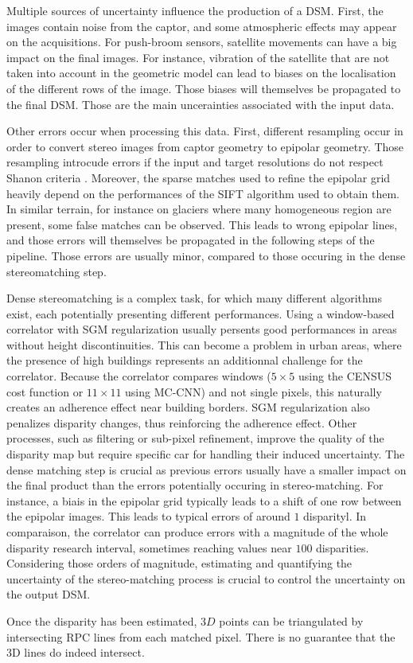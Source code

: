 Multiple sources of uncertainty influence the production of a DSM. First, the images contain noise from the captor, and some atmospheric effects may appear on the acquisitions. For push-broom sensors, satellite movements can have a big impact on the final images. For instance, vibration of the satellite that are not taken into account in the geometric model can lead to biases on the localisation of the different rows of the image. Those biases will themselves be propagated to the final DSM. Those are the main uncerainties associated with the input data.

Other errors occur when processing this data. First, different resampling occur in order to convert stereo images from captor geometry to epipolar geometry. Those resampling introcude errors if the input and target resolutions do not respect Shanon criteria \cite{delon_small_2007} . Moreover, the sparse matches used to refine the epipolar grid heavily depend on the performances of the SIFT algorithm used to obtain them. In similar terrain, for instance on glaciers where many homogeneous region are present, some false matches can be observed. This leads to wrong epipolar lines, and those errors will themselves be propagated in the following steps of the pipeline. Those errors are usually minor, compared to those occuring in the dense stereomatching step.

Dense stereomatching is a complex task, for which many different algorithms exist, each potentially presenting different performances. Using a window-based correlator with SGM regularization usually persents good performances in areas without height discontinuities. This can become a problem in urban areas, where the presence of high buildings represents an additionnal challenge for the correlator. Because the correlator compares windows ($5\times5$ using the CENSUS cost function or $11\times11$ using MC-CNN) and not single pixels, this naturally creates an adherence effect near building borders. SGM regularization also penalizes disparity changes, thus reinforcing the adherence effect. Other processes, such as filtering or sub-pixel refinement, improve the quality of the disparity map but require specific car for handling their induced uncertainty. The dense matching step is crucial as previous errors usually have a smaller impact on the final product than the errors potentially occuring in stereo-matching. For instance, a biais in the epipolar grid typically leads to a shift of one row between the epipolar images. This leads to typical errors of around $1$ disparityl. In comparaison, the correlator can produce errors with a magnitude of the whole disparity research interval, sometimes reaching values near $100$ disparities. Considering those orders of magnitude, estimating and quantifying the uncertainty of the stereo-matching process is crucial to control the uncertainty on the output DSM. 

Once the disparity has been estimated, $3D$ points can be triangulated by intersecting RPC lines from each matched pixel. There is no guarantee that the 3D lines do indeed intersect. 


\pagebreak